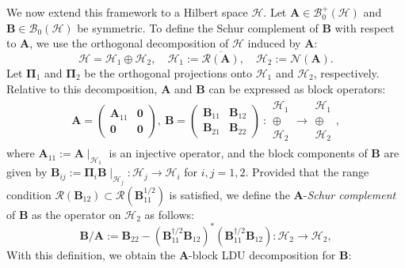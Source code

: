 \documentclass[noinfoline]{imsart}\setcounter{tocdepth}{2}
\newcommand{\m}[1]{\mathbf{#1}} %
\renewcommand{\c}[1]{\mathcal{#1}} %
\theoremstyle{plain}
\begin{document}
We now extend this framework to a Hilbert space $\c{H}$. Let $\m{A} \in \c{B}_{0}^{+}(\c{H})$ and $\m{B} \in \c{B}_{0}(\c{H})$ be symmetric. To define the Schur complement of $\m{B}$ with respect to $\m{A}$, we use the orthogonal decomposition of $\c{H}$ induced by $\m{A}$:
\begin{equation*}
    \c{H} = \c{H}_{1} \oplus \c{H}_{2}, \quad \c{H}_{1} := \overline{\c{R}(\m{A})}, \quad \c{H}_{2} := \c{N}(\m{A}).
\end{equation*}
Let $\m{\Pi}_{1}$ and $\m{\Pi}_{2}$ be the orthogonal projections onto $\c{H}_{1}$ and $\c{H}_{2}$, respectively. 
Relative to this decomposition, $\m{A}$ and $\m{B}$ can be expressed as block operators:
\begin{align*}
    \m{A} =
    \begin{pmatrix}
    \m{A}_{11} & \m{0} \\
    \m{0} & \m{0}
    \end{pmatrix},
    \
    \m{B} =
    \begin{pmatrix}
    \m{B}_{11} & \m{B}_{12} \\
    \m{B}_{21} & \m{B}_{22}
    \end{pmatrix}
    \    :
    \begin{array}{c}
    \c{H}_{1} \\
    \oplus \\
    \c{H}_{2}
    \end{array}
    \rightarrow
    \begin{array}{c}
    \c{H}_{1} \\
    \oplus \\
    \c{H}_{2}
    \end{array},
\end{align*}
where $\m{A}_{11} := \m{A} \mid_{\c{H}_{1}}$ is an injective operator, and the block components of $\m{B}$ are given by $\m{B}_{ij} := \m{\Pi}_{i} \m{B} \mid_{\c{H}_{j}}: \c{H}_{j} \to \c{H}_{i}$ for $i, j = 1, 2$.
Provided that the range condition $\c{R}(\m{B}_{12}) \subset \c{R}(\m{B}_{11}^{1/2})$ is satisfied, we define the $\m{A}$-\emph{Schur complement} of $\m{B}$ as the operator on $\c{H}_{2}$ as follows:
\begin{equation}\label{eq:gen:Schur}
    \m{B} / \m{A} := \m{B}_{22} - (\m{B}_{11}^{\dagger/2} \m{B}_{12})^{*} (\m{B}_{11}^{\dagger/2} \m{B}_{12}): \c{H}_{2} \to \c{H}_{2},
\end{equation}
With this definition, we obtain the $\m{A}$-block LDU decomposition for $\m{B}$:
\end{document}
